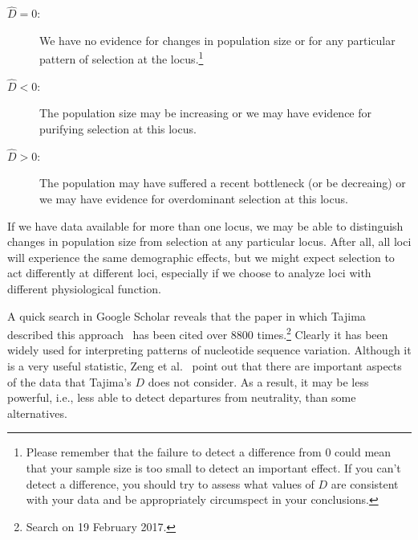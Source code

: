 \documentclass[12pt]{article}
\begin{document}
\begin{description}

\item[$\hat D = 0$:] We have no evidence for changes in population
  size or for any particular pattern of selection at the
  locus.\footnote{Please remember that the failure to detect a difference
    from 0 could mean that your sample size is too small to detect an
    important effect. If you can't detect a difference, you should try
    to assess what values of $D$ are consistent with your data and be
    appropriately circumspect in your conclusions.}

\item[$\hat D < 0$:] The population size may be increasing or we may
  have evidence for purifying selection at this locus.

\item[$\hat D > 0$:] The population may have suffered a recent
  bottleneck (or be decreaing) or we may have evidence for
  overdominant selection at this locus.

\end{description}

\noindent If we have data available for more than one locus, we may be
able to distinguish changes in population size from selection at any
particular locus. After all, all loci will experience the same
demographic effects, but we might expect selection to act differently
at different loci, especially if we choose to analyze loci with
different physiological function.

A quick search in Google Scholar reveals that the paper in which
Tajima described this approach~\cite{Tajima89} has been cited over
8800 times.\footnote{Search on 19 February 2017.} Clearly it has been
widely used for interpreting patterns of nucleotide sequence
variation. Although it is a very useful statistic, Zeng et
al.~\cite{Zeng-etal-2006} point out that there are important aspects
of the data that Tajima's $D$ does not consider. As a result, it may
be less powerful, i.e., less able to detect departures from
neutrality, than some alternatives.




\ccLicense
\end{document}
